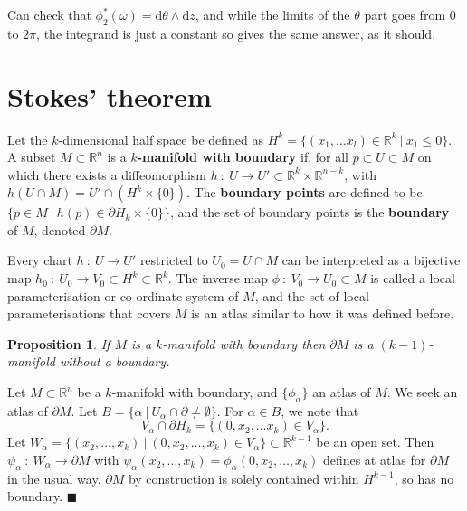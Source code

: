 \documentclass[letter-paper]{tufte-book}
\newtheorem{proposition}[theorem]{\color{pastel-blue}Proposition}
\newenvironment{proof}[1][Proof]{\begin{trivlist}
\item[\hskip \labelsep {\bfseries #1}]}{\end{trivlist}}
\newenvironment{example}[1][Example]{\begin{trivlist}
\item[\hskip \labelsep {\bfseries #1}]}{\end{trivlist}}
\newcommand{\qed}{\hfill$\blacksquare$}
\begin{document}
\begin{example}
  Can check that $\phi_2^*(\omega) = \mathrm{d}\theta \wedge \mathrm{d}z$, and while the limits of the $\theta$ part goes from $0$ to $2\pi$, the integrand is just a constant so gives the same answer, as it should.
\end{example}


\section{Stokes' theorem}

Let the $k$-dimensional half space be defined as $H^k = \{(x_1, \ldots x_l) \in \mathbb{R}^k\ | \ x_1 \leq 0\}$. A subset $M \subset \mathbb{R}^n$ is a \textbf{$k$-manifold with boundary} if, for all $p \subset U \subset M$ on which there exists a diffeomorphism $h\ :\ U \to U' \subset \mathbb{R}^k \times \mathbb{R}^{n-k}$, with $h(U \cap M) = U' \cap (H^k \times \{0\})$.  The \textbf{boundary points} are defined to be $\{p \in M\ |\ h(p) \in \partial H_k \times \{0\}\}$, and the set of boundary points is the \textbf{boundary} of $M$, denoted $\partial M$.

Every chart $h\ :\ U \to U'$ restricted to $U_0 = U \cap M$ can be interpreted as a bijective map $h_0\ :\ U_0 \to V_0 \subset H^k \subset \mathbb{R}^k$. The inverse map $\phi\ :\ V_0 \to U_0 \subset M$ is called a local parameterisation or co-ordinate system of $M$, and the set of local parameterisations that covers $M$ is an atlas similar to how it was defined before.

\begin{proposition}
  If $M$ is a $k$-manifold with boundary then $\partial M$ is a $(k-1)$-manifold without a boundary.
\end{proposition}

\begin{proof}
  Let $M \subset \mathbb{R}^n$ be a $k$-manifold with boundary, and $\{\phi_\alpha\}$ an atlas of $M$. We seek an atlas of $\partial M$. Let $B = \{\alpha\ |\ U_\alpha \cap \partial \neq \emptyset\}$. For $\alpha \in B$, we note that
  \begin{equation*}
    V_\alpha \cap \partial H_k = \{(0, x_2, \ldots x_k) \in V_\alpha\}.
  \end{equation*}
  Let $W_\alpha = \{(x_2, \ldots, x_k)\ |\ (0, x_2, \ldots, x_k) \in V_\alpha\} \subset \mathbb{R}^{k-1}$ be an open set. Then $\psi_\alpha\ :\ W_\alpha \to \partial M$ with $\psi_\alpha(x_2, \ldots, x_k) = \phi_\alpha(0, x_2, \ldots, x_k)$ defines at atlas for $\partial M$ in the usual way. $\partial M$ by construction is solely contained within $H^{k-1}$, so has no boundary. \qed
\end{proof}
\end{document}
